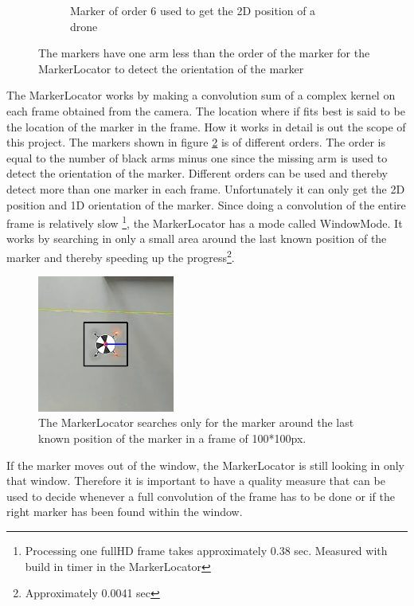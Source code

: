 \begin{figure}[H]
\begin{subfigure}[b]{0.2\textwidth}
        \caption{Marker of order 6 used to get the 2D position of a drone}
        \label{fig:markerlocator_order_6}
    \end{subfigure}
    \caption{The markers have one arm less than the order of the marker for the MarkerLocator to detect the orientation of the marker}\label{fig:markerlocator_marker}
\end{figure}




The MarkerLocator works by making a convolution sum of a complex kernel on each frame obtained from the camera.
The location where if fits best is said to be the location of the marker in the frame.
How it works in detail is out the scope of this project.
The markers shown in figure \ref{fig:markerlocator_marker} is of different orders.
The order is equal to the number of black arms minus one since the missing arm is used to detect the orientation of the marker. 
Different orders can be used and thereby detect more than one marker in each frame. Unfortunately it can only get the 2D position and 1D orientation of the marker.
Since doing a convolution of the entire frame is relatively slow \footnote{Processing one fullHD frame takes approximately 0.38 sec. Measured with build in timer in the MarkerLocator}, the MarkerLocator has a mode called WindowMode.
It works by searching in only a small area around the last known position of the marker and thereby speeding up the progress\footnote{Approximately 0.0041 sec}. 

\begin{figure}[H]
    \center
    \includegraphics[width=0.4\textwidth]{graphics/markerlocator_window.png}
  	\caption{The MarkerLocator searches only for the marker around the last known position of the marker in a frame of 100*100px.}
    \label{markerlocator_windowmode}
\end{figure}
If the marker moves out of the window, the MarkerLocator is still looking in only that window.
Therefore it is important to have a quality measure that can be used to decide whenever a full convolution of the frame has to be done or if the right marker has been found within the window. 

